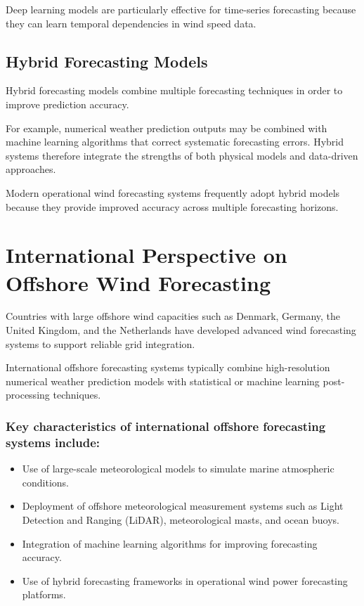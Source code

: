\documentclass[12pt,a4paper]{article}
\begin{document}
Deep learning models are particularly effective for time-series forecasting because they can learn temporal dependencies in wind speed data.

\subsection{Hybrid Forecasting Models}

Hybrid forecasting models combine multiple forecasting techniques in order to improve prediction accuracy.

For example, numerical weather prediction outputs may be combined with machine learning algorithms that correct systematic forecasting errors. Hybrid systems therefore integrate the strengths of both physical models and data-driven approaches.

Modern operational wind forecasting systems frequently adopt hybrid models because they provide improved accuracy across multiple forecasting horizons.

\section{International Perspective on Offshore Wind Forecasting}

Countries with large offshore wind capacities such as Denmark, Germany, the United Kingdom, and the Netherlands have developed advanced wind forecasting systems to support reliable grid integration.

International offshore forecasting systems typically combine high-resolution numerical weather prediction models with statistical or machine learning post-processing techniques.

\subsubsection*{Key characteristics of international offshore forecasting systems include:}

\begin{itemize}
\item Use of large-scale meteorological models to simulate marine atmospheric conditions.

\item Deployment of offshore meteorological measurement systems such as Light Detection and Ranging (LiDAR), meteorological masts, and ocean buoys.

\item Integration of machine learning algorithms for improving forecasting accuracy.

\item Use of hybrid forecasting frameworks in operational wind power forecasting platforms.
\end{itemize}
\end{document}
